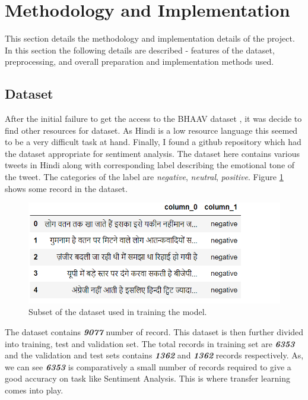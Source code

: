 \documentclass[a4paper, 12pt]{article}
\begin{document}
\begin{sloppypar}
\section{Methodology and Implementation}

This section details the methodology and implementation details of the project. In this section the following details are described -  features of the dataset, preprocessing, and overall preparation and implementation methods used.

\subsection{Dataset}

After the initial failure to get the access to the BHAAV dataset\cite{kumar_bhaav_2019}
 , it was decide to find other resources for dataset. As Hindi is a low resource language this seemed to be a very difficult task at hand. Finally, I found a github repository\cite{sinha_sid573hindi_sentiment_analysis_2021}
 which had the dataset appropriate for sentiment analysis. The dataset here contains various tweets in Hindi along with corresponding label describing the emotional tone of the tweet. The categories of the label are \textit{negative}, \textit{neutral}, \textit{positive}. Figure \ref{dataset} shows some record in the dataset.
 
 \begin{figure}[H]
 \begin{center}
 \includegraphics[scale=0.8]{dataset.png}
 \caption{ Subset of the dataset used in training the model.\label{dataset}}
 \end{center}
 \end{figure}
 
 The dataset contains \textit{\textbf{9077}} number of record. This dataset is then further divided into training, test and validation set. The total records in training set are \textit{\textbf{6353}} and the validation and test sets contains \textit{\textbf{1362}} and \textit{\textbf{1362}} records respectively. As, we can see \textit{\textbf{6353}} is comparatively a small number of records required to give a good accuracy on task like Sentiment Analysis. This is where transfer learning comes into play.
 

\end{sloppypar}
\end{document}
